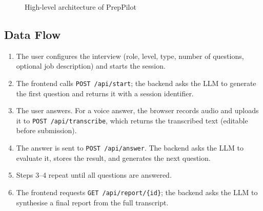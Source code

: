 \documentclass[11pt,a4paper]{article}
\newcommand{\code}[1]{\texttt{#1}}
\begin{document}
\begin{figure}[h]
\centering
{}
\caption{High-level architecture of PrepPilot}
\end{figure}

\subsection{Data Flow}
\begin{enumerate}[leftmargin=1.6em]
  \item The user configures the interview (role, level, type, number of questions,
        optional job description) and starts the session.
  \item The frontend calls \code{POST /api/start}; the backend asks the LLM to generate
        the first question and returns it with a session identifier.
  \item The user answers. For a voice answer, the browser records audio and uploads it
        to \code{POST /api/transcribe}, which returns the transcribed text (editable
        before submission).
  \item The answer is sent to \code{POST /api/answer}. The backend asks the LLM to
        evaluate it, stores the result, and generates the next question.
  \item Steps 3--4 repeat until all questions are answered.
  \item The frontend requests \code{GET /api/report/\{id\}}; the backend asks the LLM to
        synthesise a final report from the full transcript.
\end{enumerate}
\end{document}
